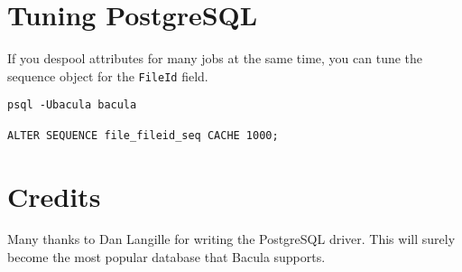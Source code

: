 \section{Tuning PostgreSQL}

If you despool attributes for many jobs at the same time, you can tune the
sequence object for the \texttt{FileId} field.
\begin{verbatim}
psql -Ubacula bacula

ALTER SEQUENCE file_fileid_seq CACHE 1000;
\end{verbatim}

\section{Credits}
Many thanks to Dan Langille for writing the PostgreSQL driver. This will
surely become the most popular database that Bacula supports. 
